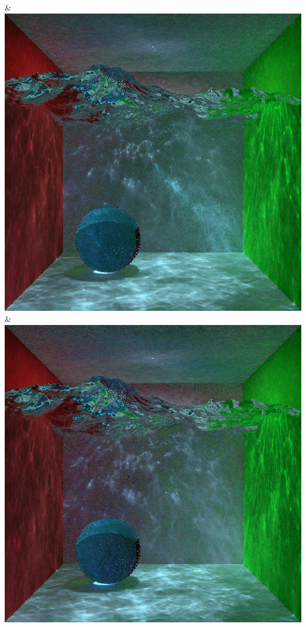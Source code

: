 & \includegraphics[width=\linewidth]{figures/py/tests/quality_comparison/nrc+sppc+Rej70_1spp_caustics_small.png}
& \includegraphics[width=\linewidth]{figures/py/tests/quality_comparison/nrc+sppc+Rej70+RejN_1spp_caustics_small.png}
